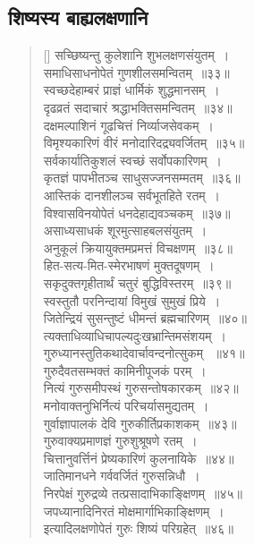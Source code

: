 \documentclass[twoside,12pt,notitlepage]{book}
\begin{document}
\subsection*{शिष्यस्य बाह्यलक्षणानि}
\begin{verse}[\versewidth]
सच्छिष्यन्तु कुलेशानि शुभलक्षणसंयुतम्~।\\[-6pt]
समाधिसाधनोपेतं गुणशीलसमन्वितम्~॥३३॥\\
स्वच्छदेहाम्बरं प्राज्ञं धार्मिकं शुद्धमानसम्~।\\[-6pt]
दृढव्रतं सदाचारं श्रद्धाभक्तिसमन्वितम्~॥३४॥\\
दक्षमल्पाशिनं गूढचित्तं निर्व्याजसेवकम्~।\\[-6pt]
विमृश्यकारिणं वीरं मनोदारिदद्र्यवर्जितम्~॥३५॥\\
सर्वकार्यातिकुशलं स्वच्छं सर्वोपकारिणम्~।\\[-6pt]
कृतज्ञं पापभीतञ्च साधुसज्जनसम्मतम्~॥३६॥\\
आस्तिकं दानशीलञ्च सर्वभूतहिते रतम्~।\\[-6pt]
विश्वासविनयोपेतं धनदेहाद्यवञ्चकम्~॥३७॥\\
असाध्यसाधकं शूरमुत्साहबलसंयुतम्~।\\[-6pt]
अनुकूलं क्रियायुक्तमप्रमत्तं विचक्षणम्~॥३८॥\\
हित-सत्य-मित-स्मेरभाषणं मुक्तदूषणम्~।\\[-6pt]
सकृदुक्तगृहीतार्थं चतुरं बुद्धिविस्तरम्~॥३९॥\\
स्वस्तुतौ परनिन्दायां विमुखं  सुमुखं प्रिये~।\\[-6pt]
जितेन्द्रियं सुसन्तुष्टं धीमन्तं ब्रह्मचारिणम्~॥४०॥\\
त्यक्ताधिव्याधिचापल्यदुःखभ्रान्तिमसंशयम्~।\\[-6pt]
गुरुध्यानस्तुतिकथादेवार्चावन्दनोत्सुकम् ~॥४१॥\\
गुरुदैवतसम्भक्तं  कामिनीपूजकं परम्~।\\[-6pt]
नित्यं गुरुसमीपस्थं गुरुसन्तोषकारकम्~॥४२॥\\
मनोवाक्तनुभिर्नित्यं परिचर्यासमुद्यतम्~।\\[-6pt]
गुर्वाज्ञापालकं देवि गुरुकीर्तिप्रकाशकम्~॥४३॥\\
गुरुवाक्यप्रमाणज्ञं गुरुशुश्रूषणे रतम्~।\\[-6pt]
चित्तानुवर्त्तिनं प्रेष्यकारिणं कुलनायिके~॥४४॥\\
जातिमानधने गर्ववर्जितं गुरुसन्निधौ~।\\[-6pt]
निरपेक्षं गुरुद्रव्ये तत्प्रसादाभिकाङ्क्षिणम्~॥४५॥\\
जपध्यानादिनिरतं मोक्षमार्गाभिकाङ्क्षिणम्~।\\[-6pt]
इत्यादिलक्षणोपेतं गुरुः शिष्यं परिग्रहेत्~॥४६॥ 
\end{verse}
\end{document}

